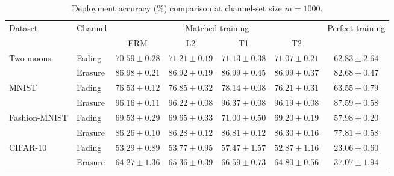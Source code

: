 \begin{table}[htb]
\centering
\caption{Deployment accuracy (\%) comparison at channel-set size $m=1000$.}
\label{tab:performance}
\begin{tabular*}{\linewidth}{@{\extracolsep{\fill}}llccccc@{}}
\toprule
\multirow{2}{*}{Dataset} & \multirow{2}{*}{Channel}
& \multicolumn{4}{c}{Matched training} & \multirow{2}{*}{Perfect training} \\
\cmidrule(lr){3-6}
& & ERM & L2 & T1 & T2 &  \\
\midrule
\multirow{2}{*}{Two moons}
& Fading
& $70.59\pm0.28$ & $\mathbf{71.21}\pm0.19$ & $71.13\pm0.38$ & $71.07\pm0.21$ & $62.83\pm2.64$ \\
& Erasure
& $86.98\pm0.21$ & $86.92\pm0.19$ & $86.99\pm0.45$ & $\mathbf{86.99}\pm0.37$ & $82.68\pm0.47$ \\
\midrule
\multirow{2}{*}{MNIST}
& Fading
& $76.53\pm0.12$ & $76.85\pm0.32$ & $\mathbf{78.14}\pm0.08$ & $76.21\pm0.31$ & $63.55\pm0.79$ \\
& Erasure
& $96.16\pm0.11$ & $96.22\pm0.08$ & $\mathbf{96.37}\pm0.08$ & $96.19\pm0.08$ & $87.59\pm0.58$ \\
\midrule
\multirow{2}{*}{Fashion-MNIST}
& Fading
& $69.53\pm0.29$ & $69.65\pm0.33$ & $\mathbf{71.00}\pm0.50$ & $69.20\pm0.19$ & $57.98\pm0.20$ \\
& Erasure
& $86.26\pm0.10$ & $86.28\pm0.12$ & $\mathbf{86.81}\pm0.12$ & $86.30\pm0.16$ & $77.81\pm0.58$ \\
\midrule
\multirow{2}{*}{CIFAR-10}
& Fading
& $53.29\pm0.89$ & $53.77\pm0.95$ & $\mathbf{57.47}\pm1.57$ & $52.87\pm1.16$ & $23.06\pm0.60$ \\
& Erasure
& $64.27\pm1.36$ & $65.36\pm0.39$ & $\mathbf{66.59}\pm0.73$ & $64.80\pm0.56$ & $37.07\pm1.94$ \\
\bottomrule
\end{tabular*}
\end{table}
